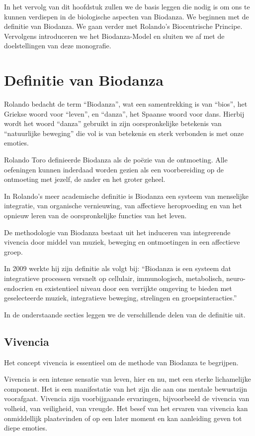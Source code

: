 \documentclass[
  11pt,
]{book}
\begin{document}
In het vervolg van dit hoofdstuk zullen we de basis leggen die nodig is om ons te kunnen verdiepen in de biologische aspecten van Biodanza. We beginnen met de definitie van Biodanza. We gaan verder met Rolando's Biocentrische Principe. Vervolgens introduceren we het Biodanza-Model en sluiten we af met de doelstellingen van deze monografie.

\section{Definitie van Biodanza}\label{definitie-van-biodanza}

Rolando bedacht de term ``Biodanza'', wat een samentrekking is van ``bios'', het Griekse woord voor ``leven'', en ``danza'', het Spaanse woord voor dans. Hierbij wordt het woord ``danza'' gebruikt in zijn oorspronkelijke betekenis van ``natuurlijke beweging'' die vol is van betekenis en sterk verbonden is met onze emoties.

Rolando Toro definieerde Biodanza als de poëzie van de ontmoeting. Alle oefeningen kunnen inderdaad worden gezien als een voorbereiding op de ontmoeting met jezelf, de ander en het groter geheel.

In Rolando's meer academische definitie is Biodanza een systeem van menselijke integratie, van organische vernieuwing, van affectieve heropvoeding en van het opnieuw leren van de oorspronkelijke functies van het leven.

De methodologie van Biodanza bestaat uit het induceren van integrerende vivencia door middel van muziek, beweging en ontmoetingen in een affectieve groep.

In 2009 werkte hij zijn definitie als volgt bij: ``Biodanza is een systeem dat integratieve processen versnelt op cellulair, immunologisch, metabolisch, neuro-endocrien en existentieel niveau door een verrijkte omgeving te bieden met geselecteerde muziek, integratieve beweging, strelingen en groepsinteracties.''

In de onderstaande secties leggen we de verschillende delen van de definitie uit.

\subsection{Vivencia}\label{vivencia}

Het concept vivencia is essentieel om de methode van Biodanza te begrijpen.

Vivencia is een intense sensatie van leven, hier en nu, met een sterke lichamelijke component. Het is een manifestatie van het zijn die aan ons mentale bewustzijn voorafgaat. Vivencia zijn voorbijgaande ervaringen, bijvoorbeeld de vivencia van volheid, van veiligheid, van vreugde. Het besef van het ervaren van vivencia kan onmiddellijk plaatsvinden of op een later moment en kan aanleiding geven tot diepe emoties.
\end{document}
